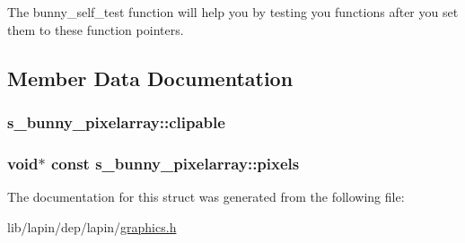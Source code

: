 The bunny\-\_\-self\-\_\-test function will help you by testing you functions after you set them to these function pointers. 

\subsection{Member Data Documentation}
\hypertarget{structs__bunny__pixelarray_ac5284a889c44198e7d08fd1e65c94cdf}{
\subsubsection[{clipable}]{ s\-\_\-bunny\-\_\-pixelarray\-::clipable}}\label{structs__bunny__pixelarray_ac5284a889c44198e7d08fd1e65c94cdf}
\hypertarget{structs__bunny__pixelarray_afb3766ff645f84f85ed5db24c7687462}{
\subsubsection[{pixels}]{\setlength{\rightskip}{0pt plus 5cm}void$\ast$ {\bf const} s\-\_\-bunny\-\_\-pixelarray\-::pixels}}\label{structs__bunny__pixelarray_afb3766ff645f84f85ed5db24c7687462}


The documentation for this struct was generated from the following file\-:\begin{DoxyCompactItemize}
\item 
lib/lapin/dep/lapin/\hyperlink{graphics_8h}{graphics.\-h}\end{DoxyCompactItemize}
